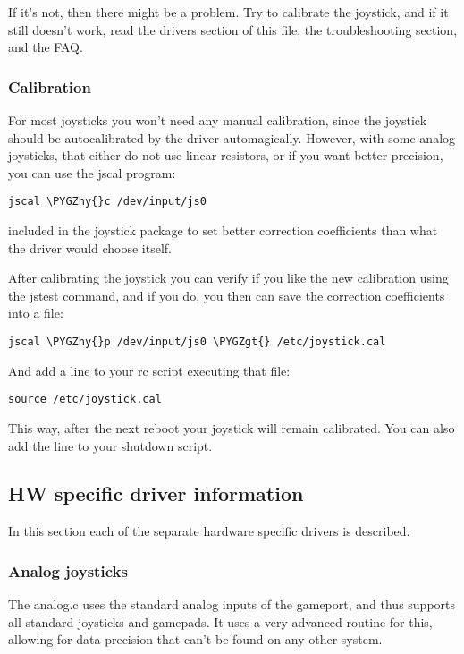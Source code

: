 \documentclass[a4paper,8pt,english]{sphinxmanual}
\def\PYGZgt{\char`\>}
\def\PYGZhy{\char`\-}
\begin{document}
If it's not, then there might be a problem. Try to calibrate the joystick,
and if it still doesn't work, read the drivers section of this file, the
troubleshooting section, and the FAQ.


\subsubsection{Calibration}
\label{input/joydev/joystick:calibration}
For most joysticks you won't need any manual calibration, since the
joystick should be autocalibrated by the driver automagically. However, with
some analog joysticks, that either do not use linear resistors, or if you
want better precision, you can use the jscal program:

\begin{Verbatim}[commandchars=\\\{\}]
jscal \PYGZhy{}c /dev/input/js0
\end{Verbatim}

included in the joystick package to set better correction coefficients than
what the driver would choose itself.

After calibrating the joystick you can verify if you like the new
calibration using the jstest command, and if you do, you then can save the
correction coefficients into a file:

\begin{Verbatim}[commandchars=\\\{\}]
jscal \PYGZhy{}p /dev/input/js0 \PYGZgt{} /etc/joystick.cal
\end{Verbatim}

And add a line to your rc script executing that file:

\begin{Verbatim}[commandchars=\\\{\}]
source /etc/joystick.cal
\end{Verbatim}

This way, after the next reboot your joystick will remain calibrated. You
can also add the  line to your shutdown script.


\subsection{HW specific driver information}
\label{input/joydev/joystick:hw-specific-driver-information}
In this section each of the separate hardware specific drivers is described.


\subsubsection{Analog joysticks}
\label{input/joydev/joystick:analog-joysticks}
The analog.c uses the standard analog inputs of the gameport, and thus
supports all standard joysticks and gamepads. It uses a very advanced
routine for this, allowing for data precision that can't be found on any
other system.
\end{document}
